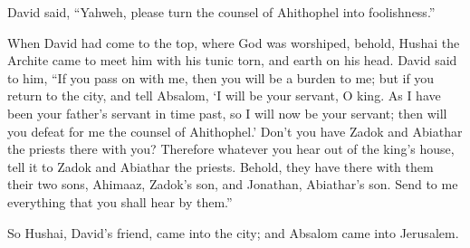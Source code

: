 {\par }{\PP David said, “Yahweh, please turn the counsel of Ahithophel into foolishness.”
\par }{\PP {}When David had come to the top, where God was worshiped, behold, Hushai the Archite came to meet him with his tunic torn, and earth on his head.
David said to him, “If you pass on with me, then you will be a burden to me;
but if you return to the city, and tell Absalom, ‘I will be your servant, O king. As I have been your father’s servant in time past, so I will now be your servant; then will you defeat for me the counsel of Ahithophel.’
Don’t you have Zadok and Abiathar the priests there with you? Therefore whatever you hear out of the king’s house, tell it to Zadok and Abiathar the priests.
Behold, they have there with them their two sons, Ahimaaz, Zadok’s son, and Jonathan, Abiathar’s son. Send to me everything that you shall hear by them.”
\par }{\PP {}So Hushai, David’s friend, came into the city; and Absalom came into Jerusalem.

}
